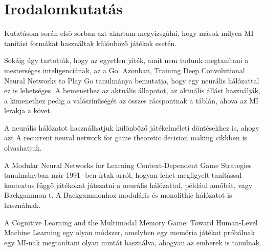 \chapter{Irodalomkutatás}

\thispagestyle{fancy}
\pagestyle{fancy}

Kutatásom során első sorban azt akartam megvizsgálni, hogy mások milyen MI tanítási formákat használtak különböző játékok esetén. 

Sokáig úgy tartották, hogy az egyetlen játék, amit nem tudunk megtanítani a mesterséges inteligenciának, az a Go. Azonban, Training Deep Convolutional Neural Networks to Play Go tanulmánya \cite{pmlr-v37-clark15} bemutatja,
 hogy egy neurális hálózattal ez is lehetséges. A bemenethez az aktuális állapotot, az aktuális állást használják, a kimenethez pedig a valószínűségét az összes rácspontnak a táblán, ahova az MI lerakja a követ. 

 A neurális hálózatot használhatjuk különböző játékelméleti döntésekhez is, ahogy azt A recurrent neural network for game theoretic decision making \cite{bhatia2014recurrent} cikkben is olvashatjuk. 

A Modular Neural Networks for Learning Context-Dependent Game Strategies \cite{boyan1992modular} tanulmányban már 1991 -ben írtak arról, hogyan lehet megfigyelt tanítással kontextus függő játékokat játszatni a neurális hálózattal, például amőbát, vagy Backgammon-t. A Backgammonhoz moduláris és monolithic hálózatot is használnak. 

A Cognitive Learning and the Multimodal Memory Game: Toward Human-Level Machine Learning \cite{4634261} egy olyan módszer, amelyben egy memória játékot próbálnak egy MI-nak megtanítani olyan mintát használva, ahogyan az emberek is tanulnak.